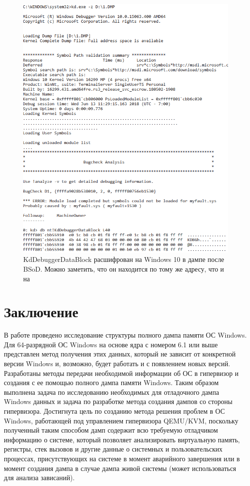 \documentclass{mipt-thesis-bs}
\begin{document}
\begin{figure}[h]
\begin{center}
    \captionsetup{justification=centering}
    \includegraphics[width=1\textwidth]{kd1.png}
    \caption{KdDebuggerDataBlock расшифрован на Windows 10 в дампе после BSoD. Можно заметить, что он находится по тому же адресу, что и на }
    \label{fig:kd2}
\end{center}
\end{figure}

\chapter{Заключение}

В работе проведено исследование структуры полного дампа памяти ОС Windows. Для 64-разрядной ОС Windows на основе ядра с номером 6.1 или выше представлен метод получения этих данных, который не зависит от конкретной версии Windows и, возможно, будет работать и с появлением новых версий. Разработаны методы передачи необходимой информации об ОС в гипервизор и создания с ее помощью полного дампа памяти Windows. Таким образом выполнена задача по исследованию необходимых для отладочного дампа Windows данных и задача по разработке метода создания дампов со стороны гипервизора. Достигнута цель по созданию метода решения проблем в ОС Windows, работающей под управлением гипервизора QEMU/KVM, поскольку полученный таким способом дамп содержит всю требуемую отладчиком информацию о системе, который позволяет анализировать виртуальную память, регистры, стек вызовов и другие данные о системных и пользовательских процессах, присутствующих на системе в момент аварийного завершения или в момент создания дампа в случае дампа живой системы (может использоваться для анализа зависаний).
\end{document}
